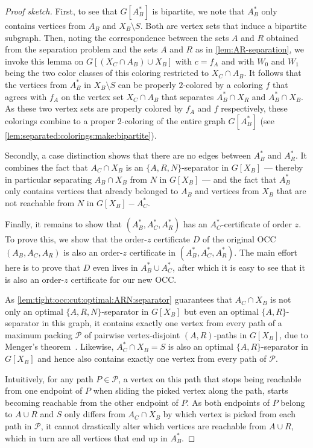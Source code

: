 \begin{proof}[Proof sketch]
	First, to see that $G[A_B^\ast]$ is bipartite, we note that $A_B^\ast$ only contains vertices from $A_B$ and $X_B \setminus S$. Both are vertex sets that induce a bipartite subgraph. Then, noting the correspondence between the sets $A$ and $R$ obtained from the separation problem and the sets $A$ and $R$ as in \cref{lem:AR-separation}, we invoke this lemma on $G[(X_C \cap A_B) \cup X_B]$ with $c = f_A$ and with $W_0$ and $W_1$ being the two color classes of this coloring restricted to $X_C \cap A_B$. It follows that the vertices from $A_B^\ast$ in $X_B \setminus S$ can be properly $2$-colored by a coloring $f$ that agrees with $f_A$ on the vertex set $X_C \cap A_B$ that separates $A_B^\ast \cap X_R$ and $A_B^\ast \cap X_B$. As these two vertex sets are properly colored by $f_A$ and $f$ respectively, these colorings combine to a proper $2$-coloring of the entire graph $G[A_B^\ast]$ (see \cref{lem:separated:colorings:make:bipartite}).
	
	Secondly, a case distinction shows that there are no edges between $A_B^\ast$ and $A_R^\ast$. It combines the fact that $A_C \cap X_B$ is an $\{A, R, N\}$-separator in $G[X_B]$ --- thereby in particular separating $A_B \cap X_B$ from $N$ in $G[X_B]$ --- and the fact that $A_B^\ast$ only contains vertices that already belonged to $A_B$ and vertices from $X_B$ that are not reachable from $N$ in $G[X_B] - A_C^\ast$.
	
	Finally, it remains to show that $(A_B^\ast, A_C^\ast, A_R^\ast)$ has an  $A_C^\ast$-certificate of order $z$. To prove this, we show that the order-$z$ certificate $D$ of the original OCC $(A_B, A_C, A_R)$ is also an order-$z$ certificate in $(A_B^\ast, A_C^\ast, A_R^\ast)$. The main effort here is to prove that $D$ even lives in $A_B^\ast \cup A_C^\ast$, after which it is easy to see that it is also an order-$z$ certificate for our new OCC.
	
 	As \cref{lem:tight:occ:cut:optimal:ARN:separator} guarantees that $A_C \cap X_B$ is not only an optimal $\{A, R, N\}$-separator in $G[X_B]$ but even an optimal $\{A, R\}$-separator in this graph, it contains exactly one vertex from every path of a maximum packing $\mathcal{P}$ of pairwise vertex-disjoint $(A, R)$-paths in $G[X_B]$, due to Menger's theorem~\cite[Theorem~9.1]{Schrijver03}. Likewise, $A_C^\ast \cap X_B = S$ is also an optimal $\{A, R\}$-separator in $G[X_B]$ and hence also contains exactly one vertex from every path of $\mathcal{P}$.
 	
 	Intuitively, for any path $P \in \mathcal{P}$, a vertex on this path that stops being reachable from one endpoint of $P$ when sliding the picked vertex along the path, starts becoming reachable from the other endpoint of $P$. As both endpoints of $P$ belong to $A \cup R$ and $S$ only differs from $A_C \cap X_B$ by which vertex is picked from each path in $\mathcal{P}$, it cannot drastically alter which vertices are reachable from $A \cup R$, which in turn are all vertices that end up in $A_B^\ast$.
 	

\end{proof}
